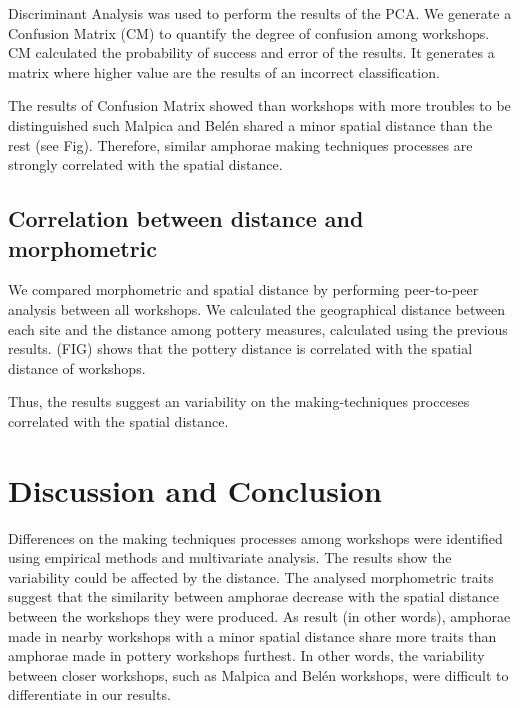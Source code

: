 \documentclass[review]{elsarticle}
\begin{document}

Discriminant Analysis was used to perform the results of the PCA. We generate a Confusion Matrix (CM) to quantify the degree of confusion among workshops. CM calculated the probability of success and error of the results. It generates a matrix where higher value are the results of an incorrect classification. 

The results of Confusion Matrix showed than workshops with more troubles to be distinguished such Malpica and Bel\'en shared a minor spatial distance than the rest (see Fig). Therefore, similar amphorae making techniques processes are strongly correlated with the spatial distance. 




\subsection{Correlation between distance and morphometric}

We compared morphometric and spatial distance by performing peer-to-peer analysis between all workshops. We calculated the geographical distance between each site and the distance among pottery measures, calculated using the previous results. (FIG) shows that the pottery distance is correlated with the spatial distance of workshops.




Thus, the results suggest an variability on the making-techniques procceses correlated with the spatial distance. 

\section{Discussion and Conclusion}

Differences on the making techniques processes among workshops were identified using empirical methods and  multivariate analysis. The results show the variability could be affected by the distance. The analysed morphometric traits suggest that the similarity between amphorae decrease with the spatial distance between the workshops they were produced. As result (in other words), amphorae made in nearby workshops with a minor spatial distance share more traits than amphorae made in pottery workshops furthest. In other words, the variability between closer workshops, such as Malpica and Bel\'en workshops, were difficult to differentiate in our results.  
\end{document}
